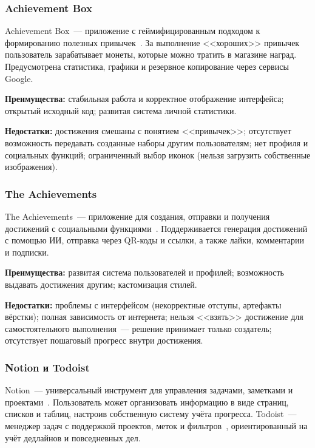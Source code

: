 \documentclass[../main.tex]{subfiles}
\begin{document}
\subsubsection{Achievement Box}

Achievement Box~--- приложение с геймифицированным подходом к формированию полезных привычек~\cite{achievement-box}. За выполнение <<хороших>> привычек пользователь зарабатывает монеты, которые можно тратить в магазине наград. Предусмотрена статистика, графики и резервное копирование через сервисы Google.

\textbf{Преимущества:} стабильная работа и корректное отображение интерфейса; открытый исходный код; развитая система личной статистики.

\textbf{Недостатки:} достижения смешаны с понятием <<привычек>>; отсутствует возможность передавать созданные наборы другим пользователям; нет профиля и социальных функций; ограниченный выбор иконок (нельзя загрузить собственные изображения).

\subsubsection{The Achievements}

The Achievements~--- приложение для создания, отправки и получения достижений с социальными функциями~\cite{the-achievements}. Поддерживается генерация достижений с помощью ИИ, отправка через QR-коды и ссылки, а также лайки, комментарии и подписки.

\textbf{Преимущества:} развитая система пользователей и профилей; возможность выдавать достижения другим; кастомизация стилей.

\textbf{Недостатки:} проблемы с интерфейсом (некорректные отступы, артефакты вёрстки); полная зависимость от интернета; нельзя <<взять>> достижение для самостоятельного выполнения~--- решение принимает только создатель; отсутствует пошаговый прогресс внутри достижения.

\subsubsection{Notion и Todoist}

Notion~--- универсальный инструмент для управления задачами, заметками и проектами~\cite{notion}. Пользователь может организовать информацию в виде страниц, списков и таблиц, настроив собственную систему учёта прогресса. Todoist~--- менеджер задач с поддержкой проектов, меток и фильтров~\cite{todoist}, ориентированный на учёт дедлайнов и повседневных дел.
\end{document}
